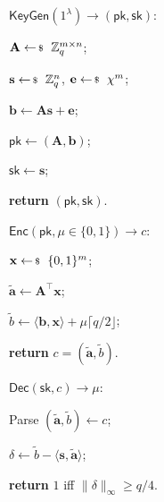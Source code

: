 \documentclass[../../book.tex]{subfiles}
\begin{document}
\begin{algoproto}[ht]
    \small
    \centering
    \begin{mdframed}[linecolor=black, linewidth=1pt,
                     skipabove=10pt, skipbelow=10pt,
                     innerleftmargin=5pt, innerrightmargin=5pt]
        \begin{minipage}[t]{0.3\linewidth}
            \colorbox{oc-blue-1}{$\mathsf{KeyGen}(1^{\lambda}) \to (\mathsf{pk}, \mathsf{sk})$:}
            \begin{algoen}
                \item $\mathbf{A} \leftarrowS \mathbb{Z}_q^{m \times n}$;
                \item $\mathbf{s} \leftarrowS \mathbb{Z}_q^n$, $\mathbf{e} \leftarrowS \chi^m$;
                \item $\mathbf{b} \gets \mathbf{A}\mathbf{s} + \mathbf{e}$;
                \item $\mathsf{pk} \gets (\mathbf{A},\mathbf{b})$;
                \item $\mathsf{sk} \gets \mathbf{s}$;
                \item \textbf{return} $(\mathsf{pk}, \mathsf{sk})$.
            \end{algoen}
        \end{minipage}
        \hfill
        \begin{minipage}[t]{0.32\linewidth}
            \colorbox{oc-blue-1}{$\mathsf{Enc}(\mathsf{pk}, \mu \in \{0,1\}) \to c$:}
            \begin{algoen}
                \item $\mathbf{x} \leftarrowS \{0,1\}^m$;
                \item $\widetilde{\mathbf{a}} \gets \mathbf{A}^{\top}\mathbf{x}$;
                \item $\widetilde{b} \gets \langle \mathbf{b}, \mathbf{x} \rangle + \mu\lceil q/2 \rfloor$;
                \item \textbf{return} $c=(\widetilde{\mathbf{a}}, \widetilde{b})$.
            \end{algoen}
        \end{minipage}
        \hfill
        \begin{minipage}[t]{0.35\linewidth}
            \colorbox{oc-blue-1}{$\mathsf{Dec}(\mathsf{sk}, c) \to \mu$:}
            \begin{algoen}
                \item Parse $(\widetilde{\mathbf{a}}, \widetilde{b}) \gets c$;
                \item $\delta \gets \widetilde{b} - \langle \mathbf{s}, \widetilde{\mathbf{a}} \rangle$;
                \item \textbf{return} $1$ iff $\|\delta\|_{\infty} \geq q/4$.
            \end{algoen}
        \end{minipage}
    \end{mdframed}
    \caption{Key generation, encryption, and decryption in Regev's scheme $\Pi_{\mathsf{PKE}}^{\text{LWE}}$ (with $m \geq (n+1)\log q$).}
    \label{fig:lwe-pke}
\end{algoproto}
\end{document}
